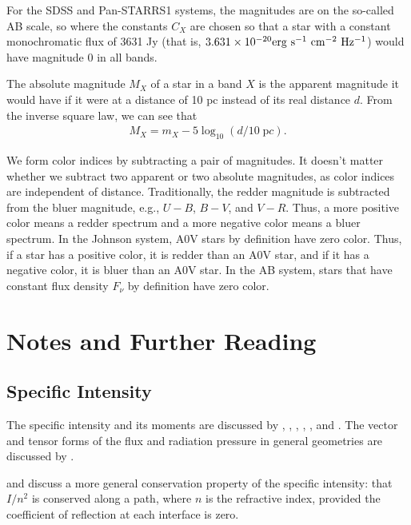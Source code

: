 For the SDSS and Pan-STARRS1 systems, the magnitudes are on the so-called AB scale, so where the constants $C_X$ are chosen so that a star with a constant monochromatic flux of 3631 Jy (that is, $3.631 \times 10^{-20}\space\mathrm{erg~s^{-1}~cm^{-2}~Hz^{-1}}$) would have magnitude 0 in all bands.

\newslide

The absolute magnitude $M_X$ of a star in a band $X$ is the
apparent magnitude it would have if it were at a distance of 10
pc instead of its real distance $d$. From the inverse square law,
we can see that
\begin{align}
M_X = m_X - 5 \log_{10} (d/10\;{\mathrm pc}).
\end{align}

\newslide

We form color indices by subtracting a pair of magnitudes. It doesn't matter whether we subtract two apparent or
two absolute magnitudes, as color indices are independent of distance. Traditionally, the redder
magnitude is subtracted from the bluer magnitude, e.g., $U-B$, $B-V$, and $V-R$. Thus, a more positive color means a redder spectrum and a more negative color means a bluer spectrum.
In the Johnson system, A0V stars by definition have zero color. Thus, if a star has a
positive color, it is redder than an A0V star, and if it has a negative
color, it is bluer than an A0V star. In the AB system, stars that have constant flux density $F_\nu$ by definition have zero color.

\newslide

\section{Notes and Further Reading}

\subsection{Specific Intensity}

The specific intensity and its moments are discussed by
\citet[pp.\ 2--18]{Mihalas-1978}, \citet[pp.\ 2--8]{Rybicki-1979},
\citet[ch.\ 4 and 5]{Boehm-Vitense-1989}, \citet[pp.\ 3--8 and
  pp.\ 11--12]{Shu-1991}, \citet[ch.\ 5]{Gray-1992}, and
\citet[pp.\ 9--12]{Rutten}. The vector and tensor forms of the flux and
radiation pressure in general geometries are discussed by
\citet[pp.\ 9--19]{Mihalas-1978}. 

\citet[pp.\ 74--75]{Milne-1930} and \citet[p.\ 4]{Mihalas-1978} discuss
a more general conservation property of the specific intensity: that
$I/n^2$ is conserved along a path, where $n$ is the refractive index,
provided the coefficient of reflection at each interface is zero.

